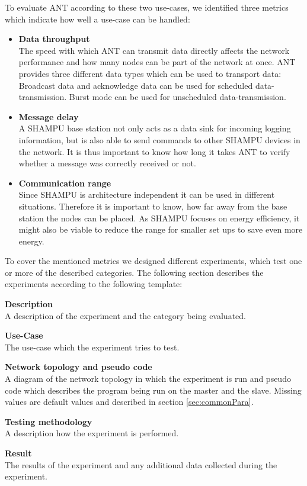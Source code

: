 To evaluate ANT according to these two use-cases, we identified three metrics which indicate how well a use-case can be handled:
	\begin{itemize}
		\item {\textbf{Data throughput }} \hfill \\ The speed with which ANT can transmit data directly affects the network performance and how many nodes can be part of the network at once. ANT provides three different data types which can be used to transport data: Broadcast data and acknowledge data can be used for scheduled data-transmission. Burst mode can be used for unscheduled data-transmission. 		
		
		\item {\textbf{Message delay}} \hfill \\ A SHAMPU base station not only acts as a data sink for incoming logging information, but is also able to send commands to other SHAMPU devices in the network.
		It is thus important to know how long it takes ANT to verify whether a message was correctly received or not.
		
		\item {\textbf{Communication range}} \hfill \\ Since SHAMPU is architecture independent it can be used in different situations. Therefore it is important to know, how far away from the base station the nodes can be placed. As SHAMPU focuses on energy efficiency, it might also be viable to reduce the range for smaller set ups to save even more energy.
	\end{itemize}

To cover the mentioned metrics we designed different experiments, which test one or more of the described categories. The following section describes the experiments according to the following template:

\begin{description}
	\item{\textbf{Description}} \hfill \\ A description of the experiment and the category being evaluated.
	\item{\textbf{Use-Case}} \hfill \\ The use-case which the experiment tries to test.
	\item{\textbf{Network topology and pseudo code}} \hfill \\ A diagram of the network topology in which the experiment is run and pseudo code which describes the program being run on the master and the slave. Missing values are default values and described in section \ref{sec:commonPara}.
	\item{\textbf{Testing methodology}} \hfill \\ A description how the experiment is performed.
	\item{\textbf{Result}} \hfill \\ The results of the experiment and any additional data collected during the experiment.
\end{description}

